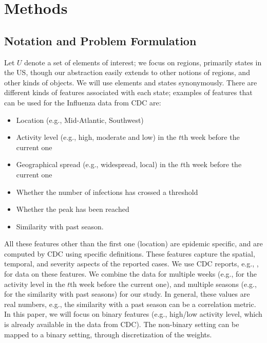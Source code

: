  \section*{Methods}
 \label{methods}


\subsection*{Notation and Problem Formulation}

Let $U$ denote a set of elements of interest; we focus on regions, primarily states
in the US, though our abstraction easily extends to other notions of regions,
and other kinds of objects. We will use elements and states synonymously.
There are different kinds of features associated with each state;
examples of features that can be used for the Influenza data from CDC are:
\begin{itemize}
\item
Location (e.g., Mid-Atlantic, Southwest)
\item
Activity level (e.g., high, moderate and low) in the $t$th week before the current one 
\item
Geographical spread (e.g., widespread, local) in the $t$th week before the current one
\item
Whether the number of infections has crossed a threshold
\item
Whether the peak has been reached
\item
Similarity with past season.
\end{itemize}

All these features other than the first one (location) are epidemic specific, and
are computed by CDC using specific definitions. These features capture the spatial, temporal,
and severity aspects of the reported cases. We use CDC reports, e.g., \cite{cdc:surveillance-report-feb10}, for data on
these features. We combine the data for
multiple weeks (e.g., for the activity level in the $t$th week before the
current one), and multiple seasons (e.g., for the similarity with past seasons) for our study.
In general, these values are real numbers, e.g., the similarity with a past season
can be a correlation metric.  In this paper, we will focus on binary features
(e.g., high/low activity level, which is already available in the data from CDC).
The non-binary setting can be mapped to a binary setting, through discretization
of the weights.

